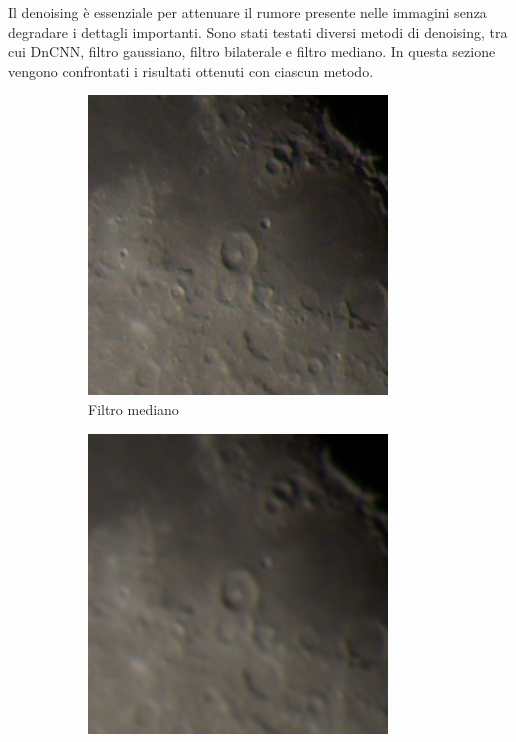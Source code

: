 Il denoising è essenziale per attenuare il rumore presente nelle immagini senza degradare i dettagli importanti. Sono stati testati diversi metodi di denoising, tra cui DnCNN, filtro gaussiano, filtro bilaterale e filtro mediano. In questa sezione vengono confrontati i risultati ottenuti con ciascun metodo.

\begin{figure}[H]
    \centering
    \begin{subfigure}[t]{0.24\textwidth}
        \centering
        \includegraphics[width=\linewidth]{../assets/den_median_zoom.png}
        \caption{Filtro mediano}
        \label{fig:mediano}
    \end{subfigure}
    \hfill
    \begin{subfigure}[t]{0.24\textwidth}
        \centering
        \includegraphics[width=\linewidth]{../assets/den_gaussian_zoom.png}

\end{subfigure}
\end{figure}
